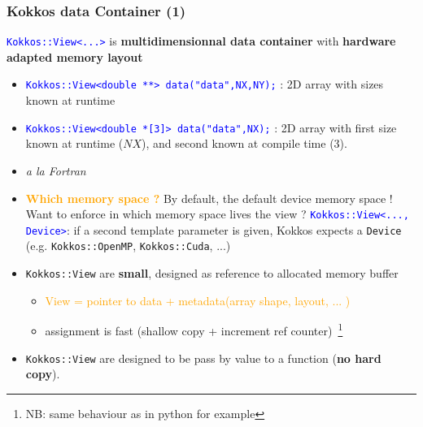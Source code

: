 \begin{frame}[fragile=singleslide]
  \frametitle{Kokkos data Container (1)}
  
  {\large \textcolor{blue}{\texttt{Kokkos::View<...>}} is \textbf{multidimensionnal data container} with \textbf{hardware adapted memory layout}}
  \begin{itemize}
  \item \textcolor{blue}{\texttt{Kokkos::View<double **> data("data",NX,NY);}} : 2D array with sizes known at runtime
  \item \textcolor{blue}{\texttt{Kokkos::View<double *[3]> data("data",NX);}} : 2D array with first size known at runtime ($NX$), and second known at compile time (3).
  \item {} {\it a la Fortran}
  \item \textcolor{orange}{\bf Which memory space ?} By default, the default device memory space !\\
    Want to enforce in which memory space lives the view ? 
    \textcolor{blue}{\texttt{Kokkos::View<..., Device>}}: if a second template parameter is given, Kokkos expects a \texttt{Device} (e.g. \texttt{Kokkos::OpenMP}, \texttt{Kokkos::Cuda}, ...)
  \item \texttt{Kokkos::View} are \textbf{small}, designed as reference to allocated memory buffer
    \begin{itemize}
    \item \textcolor{orange}{View = pointer to data + metadata(array shape, layout, ... )}
    \item assignment is fast (shallow copy + increment ref counter)~\footnote{NB: same behaviour as in python for example}
    \end{itemize}
  \item \texttt{Kokkos::View} are designed to be pass by value to a function ({\bf no hard copy}).
  \end{itemize}

\end{frame}

